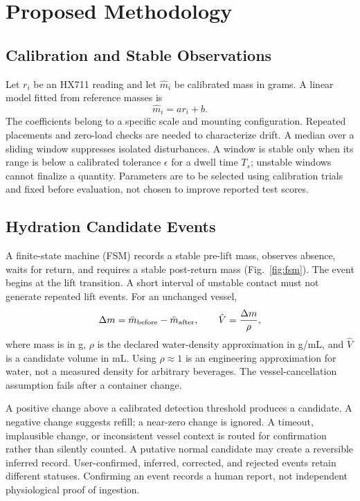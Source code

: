 \section{Proposed Methodology}\label{sec:method}
\subsection{Calibration and Stable Observations}
Let $r_i$ be an HX711 reading and let $\hat m_i$ be calibrated mass in grams. A linear model fitted from reference masses is
\begin{equation}\hat m_i=a r_i+b.\label{eq:calibration}\end{equation}
The coefficients belong to a specific scale and mounting configuration. Repeated placements and zero-load checks are needed to characterize drift. A median over a sliding window suppresses isolated disturbances. A window is stable only when its range is below a calibrated tolerance $\epsilon$ for a dwell time $T_s$; unstable windows cannot finalize a quantity. Parameters are to be selected using calibration trials and fixed before evaluation, not chosen to improve reported test scores.

\subsection{Hydration Candidate Events}
A finite-state machine (FSM) records a stable pre-lift mass, observes absence, waits for return, and requires a stable post-return mass (Fig.~\ref{fig:fsm}). The event begins at the lift transition. A short interval of unstable contact must not generate repeated lift events. For an unchanged vessel,
\begin{equation}\Delta m=\bar m_{\rm before}-\bar m_{\rm after},\qquad
\hat V=\frac{\Delta m}{\rho},\label{eq:volume}\end{equation}
where mass is in g, $\rho$ is the declared water-density approximation in g/mL, and $\hat V$ is a candidate volume in mL. Using $\rho\approx1$ is an engineering approximation for water, not a measured density for arbitrary beverages. The vessel-cancellation assumption fails after a container change.

A positive change above a calibrated detection threshold produces a candidate. A negative change suggests refill; a near-zero change is ignored. A timeout, implausible change, or inconsistent vessel context is routed for confirmation rather than silently counted. A putative normal candidate may create a reversible inferred record. User-confirmed, inferred, corrected, and rejected events retain different statuses. Confirming an event records a human report, not independent physiological proof of ingestion.

